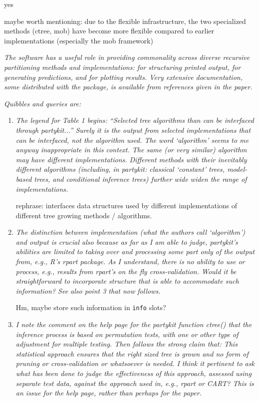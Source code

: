 \documentclass{article}
\begin{document}
yes

maybe worth mentioning: due to the flexible infrastructure, the two
specialized methods (ctree, mob) have become more flexible compared to
earlier implementations (especially the mob framework)

\textit{
The software has a useful role in providing commonality across diverse
recursive partitioning methods and implementations: for structuring printed
output, for generating predictions, and for plotting results.  Very
extensive documentation, some distributed with the package, is available
from references given in the paper.}


\textit{Quibbles and queries are:}
\begin{enumerate}
\item 
\textit{
The legend for Table 1 begins: ``Selected tree algorithms than can be
interfaced through partykit...''  Surely it is the output from selected
implementations that can be interfaced, not the algorithm used.  The word
`algorithm' seems to me anyway inappropriate in this context.  The same (or
very similar) algorithm may have different implementations.  Different
methods with their inevitably different algorithms (including, in partykit:
classical `constant' trees, model-based trees, and conditional inference
trees) further wide widen the range of implementations.}

rephrase: interfaces data structures used by different implementations of different
tree growing methods / algorithms.

\item 
\textit{
The distinction between implementation (what the authors call `algorithm')
and output is crucial also because as far as I am able to judge, partykit's
abilities are limited to taking over and processing some part only of the
output from, e.g., R's rpart package.  As I understand, there is no ability
to use or process, e.g., results from rpart's on the fly cross-validation. 
Would it be straightforward to incorporate structure that is able to
accommodate such information?  See also point 3 that now follows.}

Hm, maybe store such information in \texttt{info} slots?

\item 
\textit{
I note the comment on the help page for the partykit function ctree() that
the inference process is based on permutation tests, with one or other type
of adjustment for multiple testing.  Then follows the strong claim that:
This statistical approach ensures that the right sized tree is grown and no
form of pruning or cross-validation or whatsoever is needed.  I think it
pertinent to ask what has been done to judge the effectiveness of this
approach, assessed using separate test data, against the approach used in,
e.g., rpart or CART?  This is an issue for the help page, rather than
perhaps for the paper.}


\end{enumerate}
\end{document}

